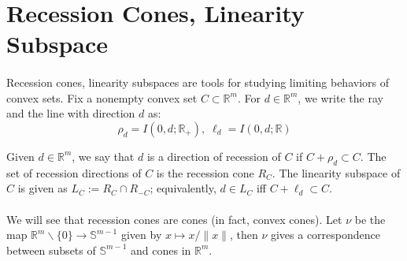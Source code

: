 \section{Recession Cones, Linearity Subspace}
\label{sect:013}

\paragraph{}Recession cones, linearity subspaces are tools for studying limiting behaviors of convex sets. Fix a nonempty convex set $C\subset \mathbb{R}^m$. For $d\in \mathbb{R}^m$, we write the ray and the line with direction $d$ as:
\[
	\rho_d=I(0,d;\mathbb{R}_{+}),\;\ell_d=I(0,d;\mathbb{R})
\]

\begin{defn}
	\label{defn:013-recessioncone}
	Given $d\in \mathbb{R}^m$, we say that $d$ is a direction of recession of $C$ if $C+\rho_d\subset C$.	The set of recession directions of $C$ is the recession cone $R_C$. The linearity subspace of $C$ is given as $L_C:=R_C\cap R_{-C}$; equivalently, $d\in L_C$ iff $C+\ell_d\subset C$.
\end{defn}

\paragraph{}We will see that recession cones are cones (in fact, convex cones). Let $\nu$ be the map $\mathbb{R}^m\smallsetminus\{0\}\to \mathbb{S}^{m-1}$ given by $x\mapsto x/\|x\|$, then $\nu$ gives a correspondence between subsets of $\mathbb{S}^{m-1}$ and cones in $\mathbb{R}^m$.

